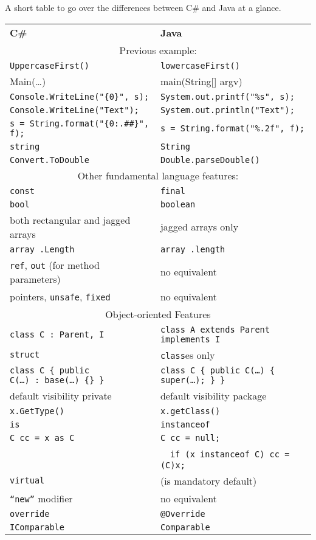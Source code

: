 A short table to go over the differences between C\# and Java at a glance.

\begin{tabular}{ll}
{\bf C\#} & {\bf Java} \\[1em]
\multicolumn{2}{c}{Previous example:} \\
\verb+UppercaseFirst()+ & \verb+lowercaseFirst()+ \\
Main(\ldots) & main(String[] argv) \\
\verb+Console.WriteLine("{0}", s);+ & \verb+System.out.printf("%s", s);+ \\
\verb+Console.WriteLine("Text");+ & \verb+System.out.println("Text");+ \\
\verb+s = String.format("{0:.##}", f);+ & \verb+s = String.format("%.2f", f);+  \\
{\tt string} & {\tt String} \\
{\tt Convert.ToDouble} & {\tt Double.parseDouble()} \\[.7em]

\multicolumn{2}{c}{Other fundamental language features:} \\
{\tt const} & {\tt final} \\
{\tt bool} & {\tt boolean} \\
both rectangular and jagged arrays & jagged arrays only \\
{\tt array .Length} & {\tt array .length} \\
{\tt ref}, {\tt out} (for method parameters) & no equivalent \\
pointers, {\tt unsafe}, {\tt fixed} & no equivalent \\[.7em]

\multicolumn{2}{c}{Object-oriented Features} \\
{\tt class C : Parent, I} & {\tt class A extends Parent implements I} \\
{\tt struct} & {\tt class}es only \\
{\tt class C \{ public C(\ldots)\ :\ base(\ldots)~\{\}~\}} & 
  {\tt class C \{ public C(\ldots)\ \{ super(\ldots); \} \}} \\
default visibility private & default visibility package \\
{\tt x.GetType()} & {\tt x.getClass()} \\
{\tt is}  & {\tt instanceof} \\
{\tt C cc = x as C} & {\tt C cc = null; }\\
& ~~{\tt if (x instanceof C) cc = (C)x; } \\
{\tt virtual} & (is mandatory default) \\
{\tt ``new''} modifier & no equivalent \\
{\tt override} & {\tt @Override} \\
{\tt IComparable} & {\tt Comparable} \\[.7em]


\end{tabular}
